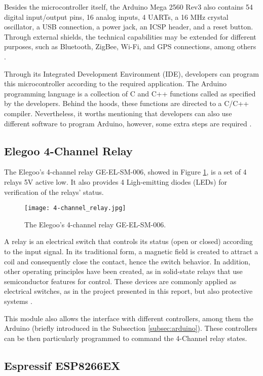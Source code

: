 Besides the microcontroller itself, the Arduino Mega 2560 Rev3 also contains 54 
digital input/output pins, 16 analog inputs, 4 UARTs, a 16 MHz crystal
oscillator, a USB connection, a power jack, an ICSP header, and a reset button. 
Through external shields, the technical capabilities may be extended for
different purposes, such as Bluetooth, ZigBee, Wi-Fi, and GPS connections, among
others \cite{arduinospecs}.

Through its Integrated Development Environment (IDE), developers can program this
microcontroller according to the required application. The Arduino programming
language is a collection of C and C++ functions called as specified by the
developers. Behind the hoods, these functions are directed to a C/C++ compiler.
Nevertheless, it worths mentioning that developers can also use different software to 
program Arduino, however, some extra steps are required \cite{arduinofaq}.

\subsection{Elegoo 4-Channel Relay}

The Elegoo's 4-channel relay GE-EL-SM-006, showed in Figure \ref{fig:relay}, is
a set of 4 relays 5V active low. It also provides 4 Ligh-emitting diodes (LEDs)
for verification of the relays' status.

\begin{figure}[h!]
    \centering
    \texttt{[image: 4-channel\_relay.jpg]}
    \caption{The Elegoo's 4-channel relay GE-EL-SM-006.}
    \label{fig:relay}
\end{figure}

A relay is an electrical switch that controls its status (open or closed) according
to the input signal. In its traditional form, a magnetic field is created to attract
a coil and consequently close the contact, hence the switch behavior. In
addition, other operating principles have been created, as in solid-state relays
that use semiconductor features for control. These devices are commonly applied
as electrical switches, as in the project presented in this report, but also 
protective systems \cite{relay}.

This module also allows the interface with different controllers, among them the Arduino
(briefly introduced in the Subsection \ref{subsec:arduino}). These
controllers can be then particularly programmed to command the 4-Channel relay
states.

\subsection{Espressif ESP8266EX}

